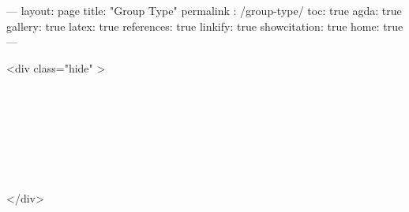 ---
layout: page
title: "Group Type"
permalink : /group-type/
toc: true
agda: true
gallery: true
latex: true
references: true
linkify: true
showcitation: true
home: true
---

<div class="hide" >
\begin{code}%
\>[0]\AgdaSymbol{\{-\#}\AgdaSpace{}%
\AgdaSpace{}%
\AgdaSpace{}%
\AgdaSymbol{\#-\}}\<%
\\
\>[0]\AgdaSpace{}%
\AgdaSpace{}%
\<%
\\
\>[0]\AgdaSpace{}%
\AgdaSpace{}%
\<%
\\
%
\\[\AgdaEmptyExtraSkip]%
\>[0]\AgdaSpace{}%
\AgdaSpace{}%
\<%
\\
\>[0]\AgdaSpace{}%
\AgdaSpace{}%
\<%
\\
\>[0]\AgdaSpace{}%
\AgdaSpace{}%
\<%
\end{code}
</div>

